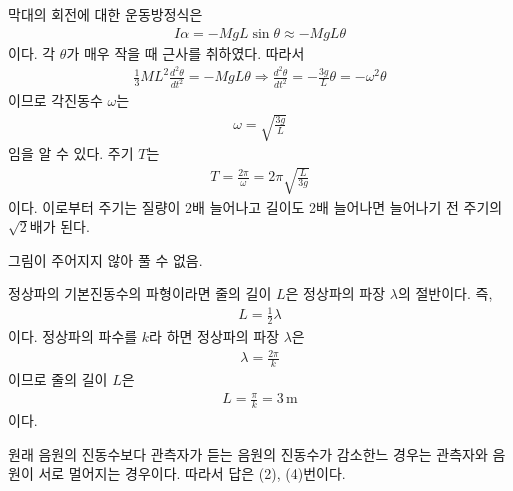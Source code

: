 \documentclass[floatfix,nofootinbib,superscriptaddress,fleqn]{revtex4-2}
\begin{document}
\vspace{0.5cm} 
막대의 회전에 대한 운동방정식은
\begin{align}
  I\alpha = -MgL\sin\theta \approx -MgL\theta
\end{align}
이다. 각 $\theta$가 매우 작을 때 근사를 취하였다. 따라서
\begin{align}
  \frac{1}{3}ML^2 \frac{d^2\theta}{dt^2} = -MgL\theta \Longrightarrow
  \frac{d^2\theta}{dt^2} = -\frac{3g}{L}\theta = -\omega^2\theta
\end{align}
이므로 각진동수 $\omega$는
\begin{align}
  \omega = \sqrt{\frac{3g}{L}}
\end{align}
임을 알 수 있다. 주기 $T$는
\begin{align}
  T = \frac{2\pi}{\omega} =2\pi\sqrt{\frac{L}{3g}}
\end{align}
이다. 이로부터 주기는 질량이 2배 늘어나고 길이도 2배 늘어나면 늘어나기 전 주기의
$\sqrt{2}$배가 된다.
\vspace{0.5cm}
 

그림이 주어지지 않아 풀 수 없음.
\vspace{0.5cm}
 

\vspace{0.5cm} 
정상파의 기본진동수의 파형이라면 줄의 길이 $L$은 정상파의 파장 $\lambda$의 절반이다. 즉,
\begin{align}
  L = \frac{1}{2}\lambda
\end{align}
이다. 정상파의 파수를 $k$라 하면 정상파의 파장 $\lambda$은
\begin{align}
  \lambda = \frac{2\pi}{k}
\end{align}
이므로 줄의 길이 $L$은
\begin{align}
  L = \frac{\pi}{k} = 3\,\mathrm{m}
\end{align}
이다.
 

\vspace{0.5cm} 
원래 음원의 진동수보다 관측자가 듣는 음원의 진동수가 감소한느 경우는 관측자와 음원이 서로 멀어지는
경우이다. 따라서 답은 (2), (4)번이다.
\vspace{0.5cm}
 
\end{document}
